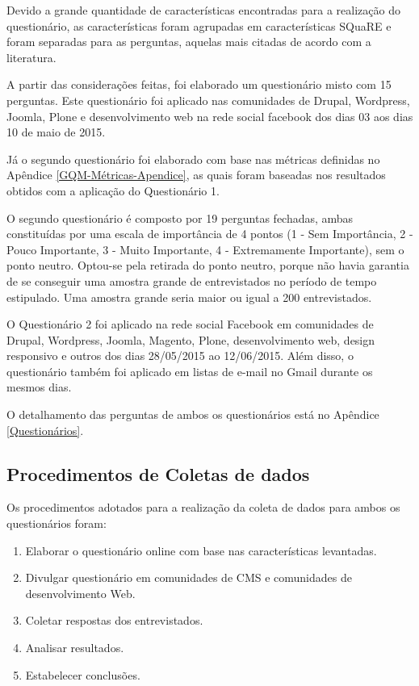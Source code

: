 Devido a grande quantidade de características encontradas para a realização do questionário, as características foram agrupadas em características SQuaRE e foram separadas para as perguntas, aquelas mais citadas de acordo com a literatura. 

A partir das considerações feitas, foi elaborado um questionário misto com 15 perguntas. Este questionário foi aplicado nas comunidades de Drupal, Wordpress, Joomla, Plone e desenvolvimento web na rede social facebook dos dias 03 aos dias 10 de maio de 2015.

Já o segundo questionário foi elaborado com base nas métricas definidas no Apêndice \ref{GQM-Métricas-Apendice}, as quais foram baseadas nos resultados obtidos com a aplicação do Questionário 1.

O segundo questionário é composto por 19 perguntas fechadas, ambas constituídas por uma escala de importância de 4 pontos (1 - Sem Importância, 2 - Pouco Importante, 3 - Muito Importante, 4 - Extremamente Importante), sem o ponto neutro. Optou-se pela retirada do ponto neutro, porque não havia garantia de se conseguir uma amostra grande de entrevistados no período de tempo estipulado. Uma amostra grande seria maior ou igual a 200 entrevistados. 

O Questionário 2 foi aplicado na rede social Facebook em comunidades de Drupal, Wordpress, Joomla, Magento, Plone, desenvolvimento web, design responsivo e outros dos dias 28/05/2015 ao 12/06/2015. Além disso, o questionário também foi aplicado em listas de e-mail no Gmail durante os mesmos dias. 

O detalhamento das perguntas de ambos os questionários está no Apêndice \ref{Questionários}.

\subsection{Procedimentos de Coletas de dados}
\label{procedimentos}
Os procedimentos adotados para a realização da coleta de dados para ambos os questionários foram:

\begin{enumerate}
\item Elaborar o questionário online com base nas características levantadas.
\item Divulgar questionário em comunidades de CMS e comunidades de desenvolvimento Web.
\item Coletar respostas dos entrevistados.
\item Analisar resultados.
\item Estabelecer conclusões.
\end{enumerate}

